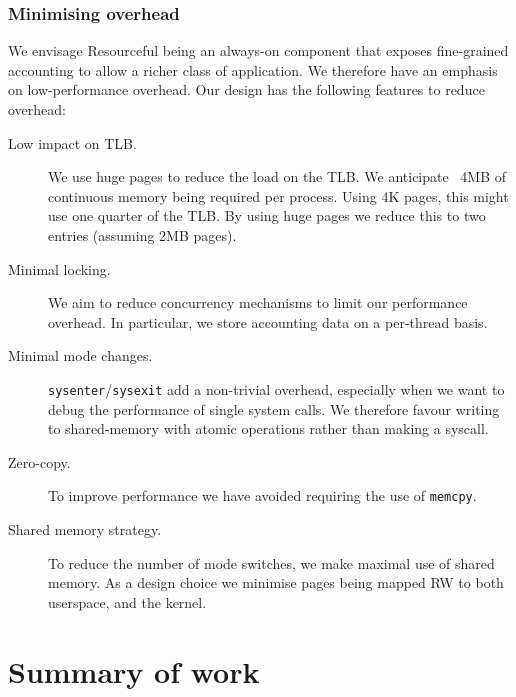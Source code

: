 \documentclass[12pt]{article}
\begin{document}
    \subsubsection{Minimising overhead}
    We envisage Resourceful being an always-on component that exposes fine-grained accounting to allow a richer class of application. We therefore have an emphasis on low-performance overhead. Our design has the following features to reduce overhead:
    \begin{description}
    \item[Low impact on TLB.] We use huge pages to reduce the load on the TLB.
    We anticipate ~4MB of continuous memory being required per process. Using 4K pages, this might use one quarter of the TLB. By using huge pages we reduce this to two entries (assuming 2MB pages).
  
    \item[Minimal locking.] We aim to reduce concurrency mechanisms to limit our performance overhead. In particular, we store accounting data on a per-thread basis.
  
    \item[Minimal mode changes.] \texttt{sysenter}/\texttt{sysexit}  add a non-trivial overhead, especially when we want to debug the performance of single system calls. We therefore favour writing to shared-memory with atomic operations rather than making a syscall.
  
    \item[Zero-copy.] To improve performance we have avoided requiring the use of \texttt{memcpy}.
  
    \item[Shared memory strategy.] To reduce the number of mode switches, we make maximal use of shared memory. As a design choice we minimise pages being mapped RW to both userspace, and the kernel.
  
    \end{description}
  

  \section{Summary of work}
\end{document}
